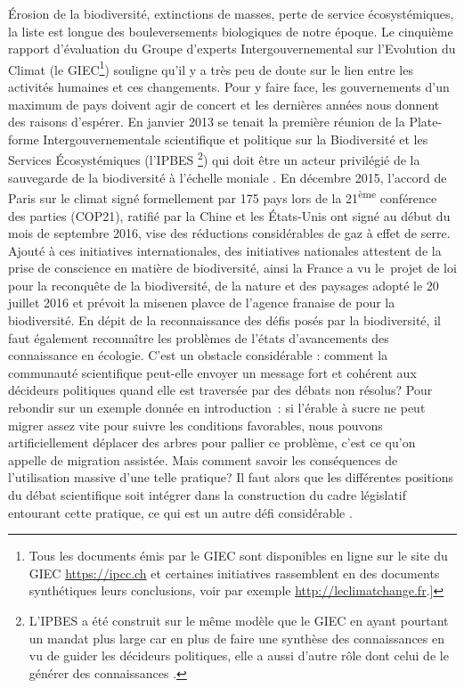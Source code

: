 Érosion de la biodiversité, extinctions de masses, perte de service
écosystémiques, la liste est longue des bouleversements biologiques de
notre époque. Le cinquième rapport d'évaluation du Groupe d'experts
Intergouvernemental sur l'Evolution du Climat (le GIEC\footnote{Tous les
  documents émis par le GIEC sont disponibles en ligne sur le site du
  GIEC \url{https://ipcc.ch} et certaines initiatives rassemblent en des
  documents synthétiques leurs conclusions, voir par exemple
  \url{http://leclimatchange.fr}.{]}}) souligne qu'il y a très peu de
doute sur le lien entre les activités humaines et ces changements. Pour
y faire face, les gouvernements d'un maximum de pays doivent agir de
concert et les dernières années nous donnent des raisons d'espérer. En
janvier 2013 se tenait la première réunion de la Plate-forme
Intergouvernementale scientifique et politique sur la Biodiversité et
les Services Écosystémiques (l'IPBES \footnote{L'IPBES a été construit
  sur le même modèle que le GIEC en ayant pourtant un mandat plus large
  car en plus de faire une synthèse des connaissances en vu de guider
  les décideurs politiques, elle a aussi d'autre rôle dont celui de le
  générer des connaissances \citep{Brooks2014}.}) qui doit être un
acteur privilégié de la sauvegarde de la biodiversité à l'échelle
moniale \citep{Diaz2015a}. En décembre 2015, l'accord de Paris sur le
climat signé formellement par 175 pays lors de la
21\textsuperscript{ème} conférence des parties (COP21), ratifié par la
Chine et les États-Unis ont signé au début du mois de septembre 2016,
vise des réductions considérables de gaz à effet de serre. Ajouté à ces
initiatives internationales, des initiatives nationales attestent de la
prise de conscience en matière de biodiversité, ainsi la France a vu
le~projet de loi pour la reconquête de la biodiversité, de la nature et
des paysages adopté le 20 juillet 2016 et prévoit la misenen plavce de
l'agence franaise de pour la biodiversité. En dépit de la reconnaissance
des défis posés par la biodiversité, il faut également reconnaître les
problèmes de l'états d'avancements des connaissance en écologie. C'est
un obstacle considérable : comment la communauté scientifique peut-elle
envoyer un message fort et cohérent aux décideurs politiques quand elle
est traversée par des débats non résolus? Pour rebondir sur un exemple
donnée en introduction~: si l'érable à sucre ne peut migrer assez vite
pour suivre les conditions favorables, nous pouvons artificiellement
déplacer des arbres pour pallier ce problème, c'est ce qu'on appelle de
migration assistée. Mais comment savoir les conséquences de
l'utilisation massive d'une telle pratique? Il faut alors que les
différentes positions du débat scientifique soit intégrer dans la
construction du cadre législatif entourant cette pratique, ce qui est un
autre défi considérable \citep{McLachlan2007}.

